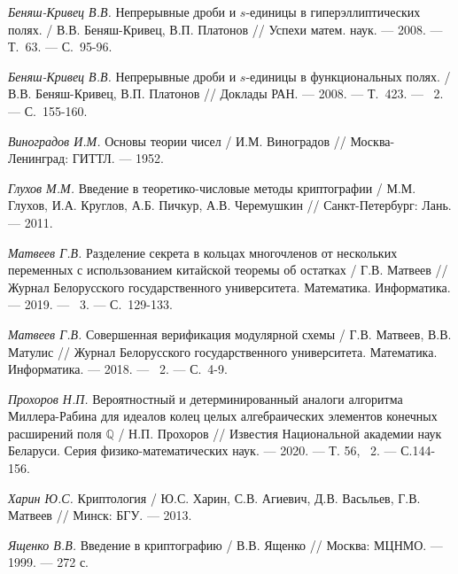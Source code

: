 \begin{thebibliography}{99}
    \textit{Беняш-Кривец В.В.} Непрерывные дроби и $s$-единицы в гиперэллиптических полях. / В.В. Беняш-Кривец, В.П. Платонов // Успехи матем. наук. — 2008. — Т.~63. — С.~95-96.
    
    \textit{Беняш-Кривец В.В.} Непрерывные дроби и $s$-единицы в функциональных полях. / В.В. Беняш-Кривец, В.П. Платонов // Доклады РАН. — 2008. — Т.~423. — \textnumero~2. — С.~155-160.

    \textit{Виноградов И.М.} Основы теории чисел / И.М. Виноградов // Москва-Ленинград: ГИТТЛ. — 1952.

    \textit{Глухов М.М.} Введение в теоретико-числовые методы криптографии / М.М. Глухов, И.А. Круглов, А.Б. Пичкур, А.В. Черемушкин // Санкт-Петербург: Лань. — 2011.
    
    \textit{Матвеев Г.В.} Разделение секрета в кольцах многочленов от нескольких переменных с использованием китайской теоремы об остатках / Г.В. Матвеев // Журнал Белорусского государственного университета. Математика. Информатика. — 2019. — \textnumero~3. — С.~129-133.
    
    \textit{Матвеев Г.В.} Совершенная верификация модулярной схемы / Г.В. Матвеев, В.В. Матулис // Журнал Белорусского государственного университета. Математика. Информатика. — 2018. — \textnumero~2. — С.~4-9.

    \textit{Прохоров Н.П.} Вероятностный и детерминированный аналоги алгоритма Миллера-Рабина для идеалов колец целых алгебраических элементов конечных расширений поля $\mathbb{Q}$ / Н.П. Прохоров // Известия Национальной академии наук Беларуси. Серия физико-математических наук. — 2020. — Т. 56, \textnumero~2. — С.144-156.
    
    \textit{Харин Ю.С.} Криптология / Ю.С. Харин, С.В. Агиевич, Д.В. Васьльев, Г.В. Матвеев // Минск: БГУ. — 2013.

    \textit{Ященко В.В.} Введение в криптографию / В.В. Ященко // Москва: МЦНМО. — 1999. — 272 с.

\end{thebibliography}



